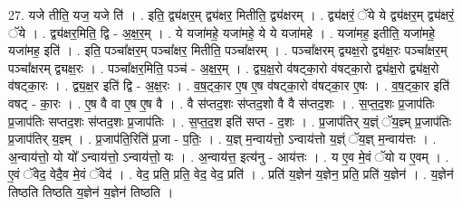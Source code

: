 \documentclass[17pt]{extarticle}
\begin{document}
27. यजे तीति॒ यज॒ यजे ति॑ । . इति॒ द्व्य॑क्षर॒म् द्व्य॑क्षर॒ मितीति॒ द्व्य॑क्षरम् । . द्व्य॑क्षरं॒ ॅये ये द्व्य॑क्षर॒म् द्व्य॑क्षरं॒ ॅये । . द्व्य॑क्षर॒मिति॒ द्वि - अ॒क्ष॒र॒म् । . ये यजा॑महे॒ यजा॑महे॒ ये ये यजा॑महे । . यजा॑मह॒ इतीति॒ यजा॑महे॒ यजा॑मह॒ इति॑ । . इति॒ पञ्चा᳚क्षर॒म् पञ्चा᳚क्षर॒ मितीति॒ पञ्चा᳚क्षरम् । . पञ्चा᳚क्षरम् द्व्यक्ष॒रो द्व्य॑क्ष॒रः पञ्चा᳚क्षर॒म् पञ्चा᳚क्षरम् द्व्यक्ष॒रः । . पञ्चा᳚क्षर॒मिति॒ पञ्च॑ - अ॒क्ष॒र॒म् । . द्व्य॒क्ष॒रो व॑षट्का॒रो व॑षट्का॒रो द्व्य॑क्ष॒रो द्व्य॑क्ष॒रो व॑षट्का॒रः । . द्व्य॒क्ष॒र इति॑ द्वि - अ॒क्ष॒रः । . व॒ष॒ट्का॒र ए॒ष ए॒ष व॑षट्का॒रो व॑षट्का॒र ए॒षः । . व॒ष॒ट्का॒र इति॑ वषट् - का॒रः । . ए॒ष वै वा ए॒ष ए॒ष वै । . वै स॑प्तद॒शः स॑प्तद॒शो वै वै स॑प्तद॒शः । . स॒प्त॒द॒शः प्र॒जाप॑तिः प्र॒जाप॑तिः सप्तद॒शः स॑प्तद॒शः प्र॒जाप॑तिः । . स॒प्त॒द॒श इति॑ सप्त - द॒शः । . प्र॒जाप॑तिर् य॒ज्ञ्ं ॅय॒ज्ञ्म् प्र॒जाप॑तिः प्र॒जाप॑तिर् य॒ज्ञ्म् । . प्र॒जाप॑ति॒रिति॑ प्र॒जा - प॒तिः॒ । . य॒ज्ञ् म॒न्वाय॑त्तो॒ ऽन्वाय॑त्तो य॒ज्ञ्ं ॅय॒ज्ञ् म॒न्वाय॑त्तः । . अ॒न्वाय॑त्तो॒ यो यो᳚ ऽन्वाय॑त्तो॒ ऽन्वाय॑त्तो॒ यः । . अ॒न्वाय॑त्त॒ इत्य॑नु - आय॑त्तः । . य ए॒व मे॒वं ॅयो य ए॒वम् । . ए॒वं ॅवेद॒ वेदै॒व मे॒वं ॅवेद॑ । . वेद॒ प्रति॒ प्रति॒ वेद॒ वेद॒ प्रति॑ । . प्रति॑ य॒ज्ञेन॑ य॒ज्ञेन॒ प्रति॒ प्रति॑ य॒ज्ञेन॑ । . य॒ज्ञेन॑ तिष्ठति तिष्ठति य॒ज्ञेन॑ य॒ज्ञेन॑ तिष्ठति । \newline
\end{document}
